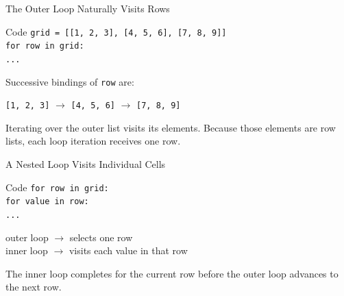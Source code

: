 \documentclass[aspectratio=169,10pt]{beamer}
\begin{document}
\begin{frame}{The Outer Loop Naturally Visits Rows}
  \begin{block}{Code}
    \texttt{grid = [[1, 2, 3], [4, 5, 6], [7, 8, 9]]}\\[0.08in]
    \texttt{for row in grid:}\\
    \hspace*{0.20in}\texttt{...}
  \end{block}

  Successive bindings of \texttt{row} are:

  \begin{center}
    \texttt{[1, 2, 3]} $\rightarrow$ \texttt{[4, 5, 6]} $\rightarrow$ \texttt{[7, 8, 9]}
  \end{center}

  \begin{keyidea}
    Iterating over the outer list visits its elements. Because those elements are row lists, each loop iteration receives one row.
  \end{keyidea}
\end{frame}

\begin{frame}{A Nested Loop Visits Individual Cells}
  \begin{block}{Code}
    \texttt{for row in grid:}\\
    \hspace*{0.20in}\texttt{for value in row:}\\
    \hspace*{0.40in}\texttt{...}
  \end{block}

  \begin{center}
    outer loop $\rightarrow$ selects one row\\[0.08in]
    inner loop $\rightarrow$ visits each value in that row
  \end{center}

  \begin{keyidea}
    The inner loop completes for the current row before the outer loop advances to the next row.
  \end{keyidea}
\end{frame}
\end{document}
